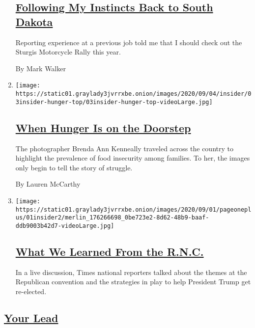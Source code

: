 \begin{enumerate}
  \hypertarget{following-my-instincts-back-to-south-dakota}{%
  \subsection{\texorpdfstring{\href{/2020/09/03/insider/south-dakota-rally-coverage.html}{Following
  My Instincts Back to South
  Dakota}}{Following My Instincts Back to South Dakota}}\label{following-my-instincts-back-to-south-dakota}}

  Reporting experience at a previous job told me that I should check out
  the Sturgis Motorcycle Rally this year.

  By Mark Walker
\item
  \texttt{[image: https://static01.graylady3jvrrxbe.onion/images/2020/09/04/insider/03insider-hunger-top/03insider-hunger-top-videoLarge.jpg]}

  \hypertarget{when-hunger-is-on-the-doorstep}{%
  \subsection{\texorpdfstring{\href{/2020/09/02/insider/food-insecurity-families.html}{When
  Hunger Is on the
  Doorstep}}{When Hunger Is on the Doorstep}}\label{when-hunger-is-on-the-doorstep}}

  The photographer Brenda Ann Kenneally traveled across the country to
  highlight the prevalence of food insecurity among families. To her,
  the images only begin to tell the story of struggle.

  By Lauren McCarthy
\item
  \texttt{[image: https://static01.graylady3jvrrxbe.onion/images/2020/09/01/pageoneplus/01insider2/merlin\_176266698\_0be723e2-8d62-48b9-baaf-ddb9003b42d7-videoLarge.jpg]}

  \hypertarget{what-we-learned-from-the-rnc}{%
  \subsection{\texorpdfstring{\href{/2020/09/01/insider/rnc-recap.html}{What
  We Learned From the
  R.N.C.}}{What We Learned From the R.N.C.}}\label{what-we-learned-from-the-rnc}}

  In a live discussion, Times national reporters talked about the themes
  at the Republican convention and the strategies in play to help
  President Trump get re-elected.
\end{enumerate}

\hypertarget{your-lead}{%
\subsection{\texorpdfstring{\href{/series/your-lead}{Your
Lead}}{Your Lead}}\label{your-lead}}

